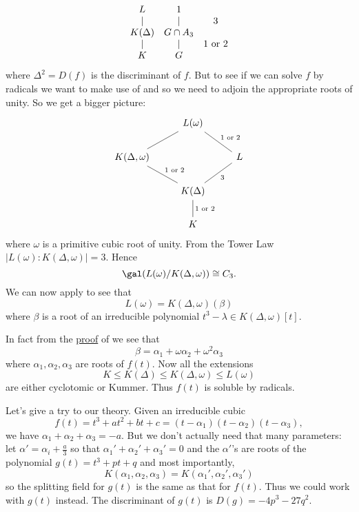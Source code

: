 \documentclass[a4paper]{article}
\begin{document}
\[
  \begin{array}[h]{ccc}
    L & 1 & \\
    | & | & 3 \\
    K(\Delta) & G \cap A_3 \\
    | & | & 1 \text{ or } 2 \\
    K & G &
  \end{array}
\]
where \(\Delta^2 = D(f)\) is the discriminant of \(f\). But to see if we can solve \(f\) by radicals we want to make use of  and so we need to adjoin the appropriate roots of unity. So we get a bigger picture:
\[
  \begin{tikzcd}
    & L(\omega) \ar[dl, dash] \ar[dr, dash, "1 \text{ or } 2"] & \\
    K(\Delta, \omega) \ar[dr, dash, "1 \text{ or } 2"] & & L \ar[dl, dash, "3"] \\
    & K(\Delta) \ar[d, dash, "1 \text{ or } 2"] & \\
    & K &
  \end{tikzcd}
\]
where \(\omega\) is a primitive cubic root of unity. From the Tower Law \(|L(\omega):K(\Delta, \omega)| = 3\). Hence
\[
  \gal(L(\omega)/K(\Delta, \omega)) \cong C_3.
\]
We can now apply  to see that
\[
  L(\omega) = K(\Delta, \omega)(\beta)
\]
where \(\beta\) is a root of an irreducible polynomial \(t^3 - \lambda \in K(\Delta, \omega)[t]\).

In fact from the \hyperref[proof:kummer theory]{proof} of  we see that
\[
  \beta = \alpha_1 + \omega \alpha_2 + \omega^2 \alpha_3
\]
where \(\alpha_1, \alpha_2, \alpha_3\) are roots of \(f(t)\). Now all the extensions
\[
  K \leq K(\Delta) \leq K(\Delta, \omega) \leq L(\omega)
\]
are either cyclotomic or Kummer. Thus \(f(t)\) is soluble by radicals.

Let's give a try to our theory. Given an irreducible cubic
\[
  f(t) = t^3 + at^2 + bt + c = (t - \alpha_1)(t - \alpha_2)(t - \alpha_3),
\]
we have \(\alpha_1 + \alpha_2 + \alpha_3 = -a\). But we don't actually need that many parameters: let \(\alpha' = \alpha_i + \frac{a}{3}\) so that \(\alpha_1' + \alpha_2' + \alpha_3' = 0\) and the \(\alpha'\)'s are roots of the polynomial \(g(t) = t^3 + pt + q\) and most importantly,
\[
  K(\alpha_1, \alpha_2, \alpha_3) = K(\alpha_1', \alpha_2', \alpha_3')
\]
so the splitting field for \(g(t)\) is the same as that for \(f(t)\). Thus we could work with \(g(t)\) instead. The discriminant of \(g(t)\) is \(D(g) = -4p^3 - 27q^2\).
\end{document}
